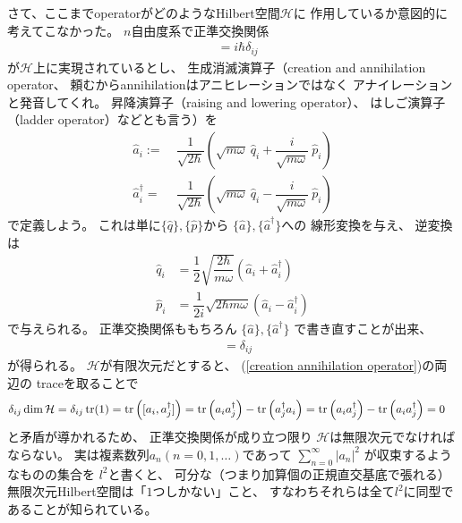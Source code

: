 さて、ここまでoperatorがどのようなHilbert空間$\mathcal{H}$に
作用しているか意図的に考えてこなかった。
$n$自由度系で正準交換関係
\begin{align}
    [ \hat{q}_i , \hat{p}_j ] &= i\hbar \delta_{ij}
\end{align}
が$\mathcal{H}$上に実現されているとし、
生成消滅演算子（creation and annihilation operator、
頼むからannihilationはアニヒレーションではなく
アナイレーションと発音してくれ。
昇降演算子（raising and lowering operator）、
はしご演算子（ladder operator）などとも言う）を
\begin{subequations}
\begin{align}
    \hat{a}_i :=\ &
    \dfrac{1}{\sqrt{2\hbar}}
    \left(
        \sqrt{
            m\omega
        }\ \hat{q}_i
        +
        \dfrac{i}{\sqrt{m\omega}}
        \ \hat{p}_i
    \right)
\label{annihilation operator definition}
\\
    \hat{a}^\dagger_i =\ &
    \dfrac{1}{\sqrt{2\hbar}}
    \left(
        \sqrt{
            m\omega
        }\ \hat{q}_i
        -
        \dfrac{i}{\sqrt{m\omega}}
        \ \hat{p}_i
    \right)
\end{align}
\end{subequations}
で定義しよう。
これは単に$\{\hat{q}\}, \{\hat{p}\}$から
$\{\hat{a}\}, \{\hat{a}^\dagger\}$への
線形変換を与え、
逆変換は
\begin{subequations}
\begin{align}
    \hat{q}_i &=
    \dfrac{1}{2}\sqrt{
        \dfrac{2\hbar}{m\omega}
    }
    \left(
        \hat{a}_i + \hat{a}^\dagger_i
    \right)
\\
    \hat{p}_i &=
    \dfrac{1}{2i}\sqrt{
        2\hbar m\omega
    }
    \left(
        \hat{a}_i - \hat{a}^\dagger_i
    \right)
\end{align}
\end{subequations}
で与えられる。
正準交換関係ももちろん
$\{\hat{a}\}, \{\hat{a}^\dagger\}$
で書き直すことが出来、
\begin{align}
    [\hat{a}_i, \hat{a}^\dagger_j]
    &=\delta_{ij}
\label{creation annihilation operator}
\end{align}
が得られる。
$ \mathcal{H} $が有限次元だとすると、
(\ref{creation annihilation operator})の両辺の
traceを取ることで
\begin{align}
    \delta_{ij}
    \dim \mathcal{H}
    &=
    \delta_{ij}
    \tr (1)
    =
    \tr \left(
        [a_i, a^\dagger_j]
    \right)
    =
    \tr \left(
        a_i a^\dagger_j
    \right)
    -
    \tr \left(
        a^\dagger_j a_i
    \right)
    =
    \tr \left(
        a_i a^\dagger_j
    \right)
    -
    \tr \left(
        a_i a^\dagger_j
    \right)
    = 0
\end{align}
と矛盾が導かれるため、
正準交換関係が成り立つ限り
$\mathcal{H}$は無限次元でなければならない。
実は複素数列$a_n (n=0,1,\dots)$であって
$\sum_{n=0}^\infty |a_n|^2$
が収束するようなものの集合を
$l^2$と書くと、
可分な（つまり加算個の正規直交基底で張れる）
無限次元Hilbert空間は「$1$つしかない」こと、
すなわちそれらは全て$l^2$に同型であることが知られている。

